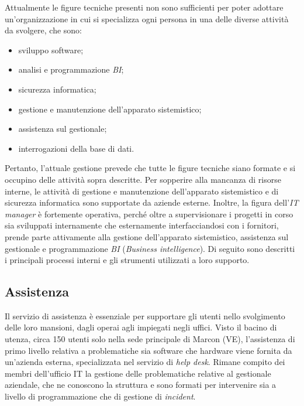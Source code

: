 Attualmente le figure tecniche presenti non sono sufficienti per poter adottare un'organizzazione in cui si specializza ogni persona in una delle diverse attività da svolgere, che sono:
\begin{itemize}
\item sviluppo software; 
\item analisi e programmazione \textit{BI}; 
\item sicurezza informatica; 
\item gestione e manutenzione dell'apparato sistemistico; 
\item assistenza sul gestionale; 
\item interrogazioni della base di dati.
\end{itemize}
Pertanto, l'attuale gestione prevede che tutte le figure tecniche siano formate e si occupino delle attività sopra descritte. Per sopperire alla mancanza di risorse interne, le attività di gestione e manutenzione dell'apparato sistemistico e di sicurezza informatica sono supportate da aziende esterne. 
Inoltre, la figura dell'\textit{IT manager} è fortemente operativa, perché oltre a supervisionare i progetti in corso sia sviluppati internamente che esternamente interfacciandosi con i fornitori, prende parte attivamente alla gestione dell'apparato sistemistico, assistenza sul gestionale e programmazione \textit{BI} (\textit{Business intelligence}).
Di seguito sono descritti i principali processi interni e gli strumenti utilizzati a loro supporto.

\subsection{Assistenza}

Il servizio di assistenza è essenziale per supportare gli utenti nello svolgimento delle loro mansioni, dagli operai agli impiegati negli uffici. Visto il bacino di utenza, circa 150 utenti solo nella sede principale di Marcon (VE), l'assistenza di primo livello relativa a problematiche sia software che hardware viene fornita da un'azienda esterna, specializzata nel servizio di \textit{help desk}. Rimane compito dei membri dell'ufficio IT la gestione delle problematiche relative al gestionale aziendale, che ne conoscono la struttura e sono formati per intervenire sia a livello di programmazione che di gestione di \textit{incident}. 



